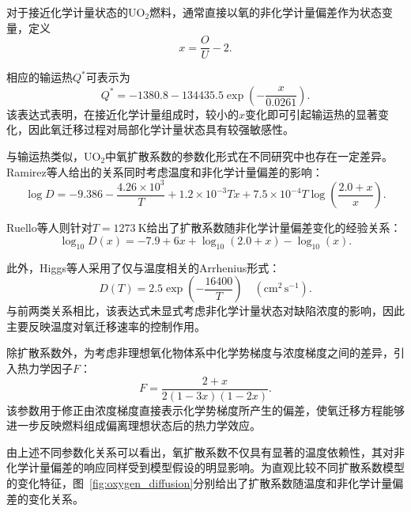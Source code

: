 对于接近化学计量状态的UO$_2$燃料，通常直接以氧的非化学计量偏差作为状态变量，定义
\begin{equation}
	x=\frac{O}{U}-2 .
\end{equation}

相应的输运热$Q^{*}$可表示为
\begin{equation}
	Q^{*}
	=
	-1380.8
	-
	134435.5
	\exp\left(
	-\frac{x}{0.0261}
	\right).
\end{equation}
该表达式表明，在接近化学计量组成时，较小的$x$变化即可引起输运热的显著变化，因此氧迁移过程对局部化学计量状态具有较强敏感性。

与输运热类似，UO$_2$中氧扩散系数的参数化形式在不同研究中也存在一定差异。Ramirez等人\cite{ramirezSimulationsHeatOxygen2006}给出的关系同时考虑温度和非化学计量偏差的影响：
\begin{equation}
	\log D
	=
	-9.386
	-
	\frac{4.26\times10^{3}}{T}
	+
	1.2\times10^{-3}Tx
	+
	7.5\times10^{-4}T
	\log\left(
	\frac{2.0+x}{x}
	\right).
\end{equation}

Ruello等人\cite{ruelloChemicalDiffusionUranium2004}则针对$T=1273~\mathrm{K}$给出了扩散系数随非化学计量偏差变化的经验关系：
\begin{equation}
	\log_{10}D(x)
	=
	-7.9
	+
	6x
	+
	\log_{10}(2.0+x)
	-
	\log_{10}(x).
\end{equation}

此外，Higgs等人\cite{higgsConceptualModelFuel2007}采用了仅与温度相关的Arrhenius形式：
\begin{equation}
	D(T)
	=
	2.5
	\exp\left(
	-\frac{16400}{T}
	\right)
	\quad
	\left(\mathrm{cm^2\,s^{-1}}\right).
\end{equation}
与前两类关系相比，该表达式未显式考虑非化学计量状态对缺陷浓度的影响，因此主要反映温度对氧迁移速率的控制作用。

除扩散系数外，为考虑非理想氧化物体系中化学势梯度与浓度梯度之间的差异，引入热力学因子$F$：
\begin{equation}
	F
	=
	\frac{2+x}
	{2(1-3x)(1-2x)}.
\end{equation}
该参数用于修正由浓度梯度直接表示化学势梯度所产生的偏差，使氧迁移方程能够进一步反映燃料组成偏离理想状态后的热力学效应。

由上述不同参数化关系可以看出，氧扩散系数不仅具有显著的温度依赖性，其对非化学计量偏差的响应同样受到模型假设的明显影响。为直观比较不同扩散系数模型的变化特征，图~\ref{fig:oxygen_diffusion}分别给出了扩散系数随温度和非化学计量偏差的变化关系。

